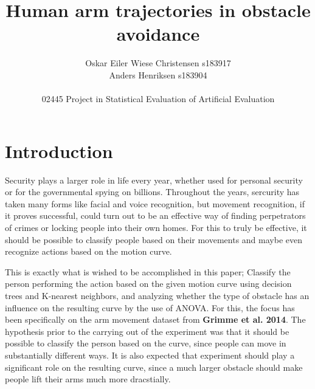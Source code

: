 \documentclass[11pt, fleqn, titlepage]{article}
\title{Human arm trajectories in obstacle avoidance}
\author{Oskar Eiler Wiese Christensen s183917 \\ Anders Henriksen s183904 \\ \\ 02445 Project in Statistical Evaluation of Artificial Evaluation}
\date{\today \vspace{2.5cm} \section*{\small Summary} 
\justify{\footnotesize  Security and access authorization plays a big role in modern society. Improvement of these systems could be accomplished by using movement curves to identify the person and give access only to those with authority. The purpose of this paper is to investigate if it is possible to identify people based on movement curves by using two machine learning models, K-nearest neighbors and a binary decision tree, as well as to test if experiment has a significant effect on curve. The results show that it is to some extent possible to predict person from curve and that KNN is most effective at this task. Meanwhile, experiment has a significant effect on curve. This implies that movement curves might be useful for classifying people if using more complicated machine learning models. Meanwhile, performing different actions lead to different curves, which has positive implications for the possibility of movement-based surveillance.}}
\begin{document}
\maketitle

\section{Introduction}
Security plays a larger role in life every year, whether used for personal security or for the governmental spying on billions. Throughout the years, sercurity has taken many forms like facial and voice recognition, but movement recognition, if it proves successful, could turn out to be an effective way of finding perpetrators of crimes or locking people into their own homes. For this to truly be effective, it should be possible to classify people based on their movements and maybe even recognize actions based on the motion curve.

This is exactly what is wished to be accomplished in this paper; Classify the person performing the action based on the given motion curve using decision trees and K-nearest neighbors, and analyzing whether the type of obstacle has an influence on the resulting curve by the use of ANOVA. For this, the focus has been specifically on the arm movement dataset from \textbf{Grimme et al. 2014}. The hypothesis prior to the carrying out of the experiment was that it should be possible to classify the person based on the curve, since people can move in substantially different ways. It is also expected that experiment should play a significant role on the resulting curve, since a much larger obstacle should make people lift their arms much more dracstially.
\end{document}
